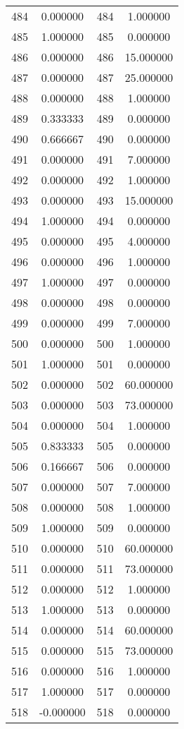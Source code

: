\documentclass[12pt]{article}
\begin{document}
\begin{longtable}{@{}cccc@{}}
484 & 0.000000 & 484 & 1.000000 \\
485 & 1.000000 & 485 & 0.000000 \\
486 & 0.000000 & 486 & 15.000000 \\
487 & 0.000000 & 487 & 25.000000 \\
488 & 0.000000 & 488 & 1.000000 \\
489 & 0.333333 & 489 & 0.000000 \\
490 & 0.666667 & 490 & 0.000000 \\
491 & 0.000000 & 491 & 7.000000 \\
492 & 0.000000 & 492 & 1.000000 \\
493 & 0.000000 & 493 & 15.000000 \\
494 & 1.000000 & 494 & 0.000000 \\
495 & 0.000000 & 495 & 4.000000 \\
496 & 0.000000 & 496 & 1.000000 \\
497 & 1.000000 & 497 & 0.000000 \\
498 & 0.000000 & 498 & 0.000000 \\
499 & 0.000000 & 499 & 7.000000 \\
500 & 0.000000 & 500 & 1.000000 \\
501 & 1.000000 & 501 & 0.000000 \\
502 & 0.000000 & 502 & 60.000000 \\
503 & 0.000000 & 503 & 73.000000 \\
504 & 0.000000 & 504 & 1.000000 \\
505 & 0.833333 & 505 & 0.000000 \\
506 & 0.166667 & 506 & 0.000000 \\
507 & 0.000000 & 507 & 7.000000 \\
508 & 0.000000 & 508 & 1.000000 \\
509 & 1.000000 & 509 & 0.000000 \\
510 & 0.000000 & 510 & 60.000000 \\
511 & 0.000000 & 511 & 73.000000 \\
512 & 0.000000 & 512 & 1.000000 \\
513 & 1.000000 & 513 & 0.000000 \\
514 & 0.000000 & 514 & 60.000000 \\
515 & 0.000000 & 515 & 73.000000 \\
516 & 0.000000 & 516 & 1.000000 \\
517 & 1.000000 & 517 & 0.000000 \\
518 & -0.000000 & 518 & 0.000000 \\

\end{longtable}
\end{document}
